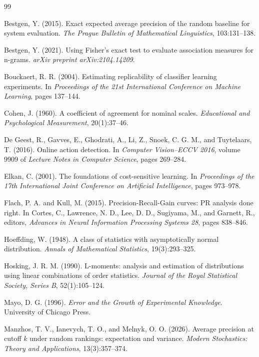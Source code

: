 \documentclass[11pt]{article}
\theoremstyle{remark}
\begin{document}
\newpage

\begin{thebibliography}{99}

Bestgen, Y. (2015).
Exact expected average precision of the random baseline for system evaluation.
\emph{The Prague Bulletin of Mathematical Linguistics}, 103:131--138.

Bestgen, Y. (2021).
Using Fisher's exact test to evaluate association measures for n-grams.
\emph{arXiv preprint arXiv:2104.14209}.

Bouckaert, R. R. (2004).
Estimating replicability of classifier learning experiments.
In \emph{Proceedings of the 21st International Conference on Machine Learning}, pages 137--144.

Cohen, J. (1960).
A coefficient of agreement for nominal scales.
\emph{Educational and Psychological Measurement}, 20(1):37--46.

De Geest, R., Gavves, E., Ghodrati, A., Li, Z., Snoek, C. G. M., and Tuytelaars, T. (2016).
Online action detection.
In \emph{Computer Vision--ECCV 2016}, volume 9909 of \emph{Lecture Notes in Computer Science}, pages 269--284.

Elkan, C. (2001).
The foundations of cost-sensitive learning.
In \emph{Proceedings of the 17th International Joint Conference on Artificial Intelligence}, pages 973--978.

Flach, P. A. and Kull, M. (2015).
Precision-Recall-Gain curves: PR analysis done right.
In Cortes, C., Lawrence, N. D., Lee, D. D., Sugiyama, M., and Garnett, R., editors,
\emph{Advances in Neural Information Processing Systems 28}, pages 838--846.

Hoeffding, W. (1948).
A class of statistics with asymptotically normal distribution.
\emph{Annals of Mathematical Statistics}, 19(3):293--325.

Hosking, J. R. M. (1990).
L-moments: analysis and estimation of distributions using linear combinations of order statistics.
\emph{Journal of the Royal Statistical Society, Series B}, 52(1):105--124.

Mayo, D. G. (1996).
\emph{Error and the Growth of Experimental Knowledge}.
University of Chicago Press.

Manzhos, T. V., Ianevych, T. O., and Melnyk, O. O. (2026).
Average precision at cutoff $k$ under random rankings: expectation and variance.
\emph{Modern Stochastics: Theory and Applications}, 13(3):357--374.


\end{thebibliography}
\end{document}
